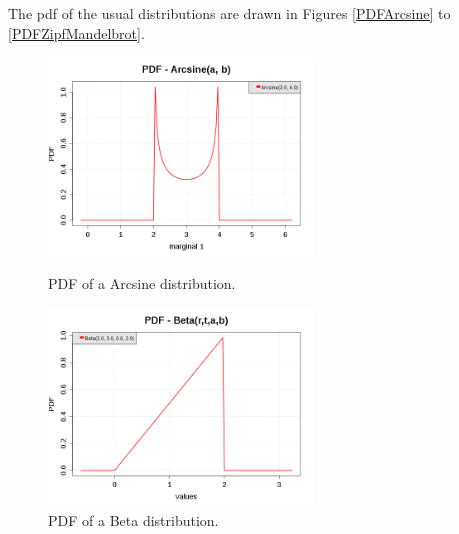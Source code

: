 The pdf of the usual distributions are drawn in Figures \ref{PDFArcsine} to \ref{PDFZipfMandelbrot}.

\begin{figure}[H]
  \begin{minipage}{10cm}
    \begin{center}
      \includegraphics[width=7cm]{pdf_Arcsine.png}
      \caption{PDF of a Arcsine distribution.}
      \label{PDFArcsine}
    \end{center}
  \end{minipage}
  \hfill
  \begin{minipage}{10cm}
    \begin{center}
      \includegraphics[width=7cm]{pdf_Beta_1.png}
      \caption{PDF of a Beta distribution.}
      \label{PDFBeta1}
    \end{center}
  \end{minipage}
\end{figure}

